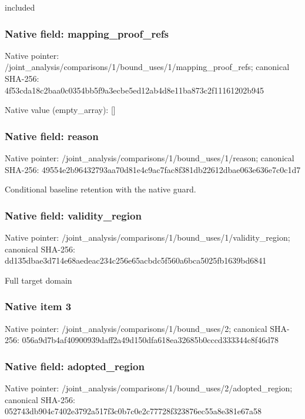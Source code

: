 \documentclass[10pt,a4paper]{article}
\begin{document}
\begingroup\raggedright\sloppy included\par\endgroup

\subsubsection{Native field: mapping\_\allowbreak{}proof\_\allowbreak{}refs}
Native pointer: /joint\_\allowbreak{}analysis/comparisons/1/bound\_\allowbreak{}uses/1/mapping\_\allowbreak{}proof\_\allowbreak{}refs; canonical SHA-256: 4f53cda18c2baa0c0354bb5f9a3ecbe5ed12ab4d8e11ba873c2f11161202b945

Native value (empty\_\allowbreak{}array): []

\subsubsection{Native field: reason}
Native pointer: /joint\_\allowbreak{}analysis/comparisons/1/bound\_\allowbreak{}uses/1/reason; canonical SHA-256: 49554e2b96432793aa70d81e4c9ac7fac8f381db22612dbae063e636e7c0c1d7

\begingroup\raggedright\sloppy Conditional baseline retention with the native guard.\par\endgroup

\subsubsection{Native field: validity\_\allowbreak{}region}
Native pointer: /joint\_\allowbreak{}analysis/comparisons/1/bound\_\allowbreak{}uses/1/validity\_\allowbreak{}region; canonical SHA-256: dd135dbae3d714e68aedeac234c256e65acbdc5f560a6bca5025fb1639bd6841

\begingroup\raggedright\sloppy Full target domain\par\endgroup

\subsubsection{Native item 3}
Native pointer: /joint\_\allowbreak{}analysis/comparisons/1/bound\_\allowbreak{}uses/2; canonical SHA-256: 056a9d7b4af40900939daff2a49d150dfa618ea32685b0cccd333344c8f46d78

\subsubsection{Native field: adopted\_\allowbreak{}region}
Native pointer: /joint\_\allowbreak{}analysis/comparisons/1/bound\_\allowbreak{}uses/2/adopted\_\allowbreak{}region; canonical SHA-256: 052743db904c7402e3792a517f3c0b7c0e2c77728f323876ec55a8e381e67a58
\end{document}
